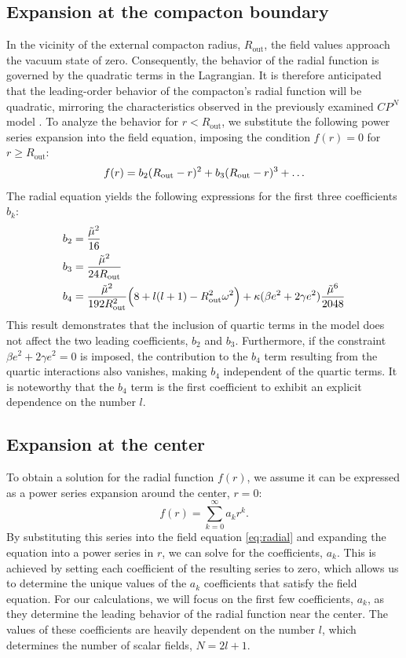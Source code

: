 \documentclass[aps,prd,superscriptaddress,notitlepage,11pt,final,longbibliography,nofootinbib]{revtex4-1}
\numberwithin{equation}{section}
\begin{document}
\subsection{Expansion at the compacton boundary}
In the vicinity of the external compacton radius, $R_{\text{out}}$, the field values approach the vacuum state of zero. Consequently, the behavior of the radial function is governed by the quadratic terms in the Lagrangian. It is therefore anticipated that the leading-order behavior of the compacton's radial function will be quadratic, mirroring the characteristics observed in the previously examined ${C}P^N$ model \cite{Klimas:2017eft}. To analyze the behavior for $r < R_{\text{out}}$, we substitute the following power series expansion into the field equation, imposing the condition $f(r)=0$ for $r \ge R_{\text{out}}$:
\[
f(r)=b_2(R_{\rm out}-r)^2+b_3(R_{\rm out}-r)^3+\ldots
\]  
The radial equation yields the following expressions for the first three coefficients $b_k$:
\begin{align}
b_2&=\frac{\tilde \mu^2}{16}\label{eq:b2}\\
b_3&=\frac{\tilde \mu^2}{24R_{\rm out}}\label{eq:b3}\\
b_4&=\frac{\tilde \mu^2}{192 R_{\rm out}^2}\Big(8+l(l+1)-R_{\rm out}^2\omega^2\Big)+\kappa(\beta e^2+2\gamma e^2)\frac{\tilde\mu^6}{2048}\label{eq:b4}
\end{align}
This result demonstrates that the inclusion of quartic terms in the model does not affect the two leading coefficients, $b_2$ and $b_3$. Furthermore, if the constraint $\beta e^2+2\gamma e^2=0$ is imposed, the contribution to the $b_4$ term resulting from the quartic interactions also vanishes, making $b_4$ independent of the quartic terms. It is noteworthy that the $b_4$ term is the first coefficient to exhibit an explicit dependence on the number $l$.


\subsection{Expansion at the center}
To obtain a solution for the radial function $f(r)$, we assume it can be expressed as a power series expansion around the center, $r=0$: 
\begin{equation}
f(r)=\sum_{k=0}^{\infty}a_k r^k.\label{expansion-center}
\end{equation}
By substituting this series into the field equation \eqref{eq:radial} and expanding the equation into a power series in $r$, we can solve for the coefficients, $a_k$. This is achieved by setting each coefficient of the resulting series to zero, which allows us to determine the unique values of the $a_k$ coefficients that satisfy the field equation. For our calculations, we will focus on the first few coefficients, $a_k$, as they determine the leading behavior of the radial function near the center. The values of these coefficients are heavily dependent on the number $l$, which determines the number of scalar fields, $N=2l+1$.
\end{document}
